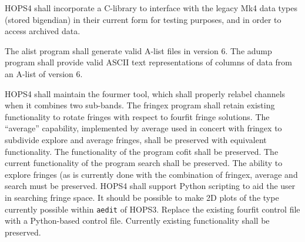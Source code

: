 \begin{description}
 HOPS4 shall incorporate a C-library to interface with the legacy
  \acs{Mk4} data types (stored \acs{bigendian}) in their current form for
  testing purposes, and in order to access archived data.

 The \acs{alist} program shall generate valid \acs{A-list} files in
  version 6.
 The \acs{adump} program shall provide valid ASCII text representations
  of columns of data from an \acs{A-list} of version 6.

 HOPS4 shall maintain the \acs{fourmer} tool, which shall properly
  relabel channels when it combines two sub-bands.
 The \acs{fringex} program shall retain existing functionality to rotate
  fringes with respect to fourfit fringe solutions.
 The ``average'' capability, implemented by \acs{average} used in
  concert with \acs{fringex} to subdivide explore and average fringes, shall be
  preserved with equivalent functionality.
 The functionality of the program \acs{cofit} shall be preserved.
 The current functionality of the program \acs{search} shall be
  preserved.
 The ability to explore fringes (as is currently done with the
  combination of \acs{fringex}, \acs{average} and search must be preserved.
  HOPS4 shall support \acs{Python} scripting to aid the user in searching
  fringe space.
 It should be possible to make 2D plots of the type currently possible
  within \texttt{\acs{aedit}} of HOPS3.
 Replace the existing \acs{fourfit} control file with a
  \acs{Python}-based control file. Currently existing functionality shall be
  preserved.
\end{description}

%
%
